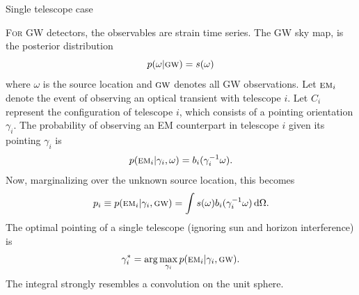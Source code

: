 \documentclass[portrait]{a0poster}
\newcommand{\EM}[1]{\ensuremath{\textsc{\textrm{em}}_#1}}
\newcommand{\GW}{\ensuremath{\textsc{\textrm{gw}}}}
\newcommand{\heading}[1]{{\fontspec{Marvel}\Huge\noindent#1}\vspace{1em}}
\begin{document}
\framebreak

\heading{Single telescope case}

\lettrine{F}{\textnormal{or}} GW detectors, the observables are strain time series.  The GW sky map, is the posterior distribution
$$
	p(\omega | \GW) = s(\omega)
$$
where $\omega$ is the source location and $\GW$ denotes all GW observations.  Let $\EM{i}$ denote the event of observing an optical transient with telescope $i$.  Let $C_i$ represent the configuration of telescope $i$, which consists of a pointing orientation $\gamma_i$.  The probability of observing an EM counterpart in telescope $i$ given its pointing $\gamma_i$ is
$$
	p(\EM{i} | \gamma_i, \omega) = b_i(\gamma_i^{-1} \omega).
$$
Now, marginalizing over the unknown source location, this becomes
$$
	p_i \equiv p (\EM{i} | \gamma_i, \GW) = \int s(\omega) b_i(\gamma_i^{-1} \omega) \, \mathrm{d}\Omega.
$$
The optimal pointing of a single telescope (ignoring sun and horizon interference) is
$$
	\gamma_i^* = \arg \max_{\gamma_i} p(\EM{i} | \gamma_i, \GW).
$$
The integral strongly resembles a convolution on the unit sphere.
\end{document}
